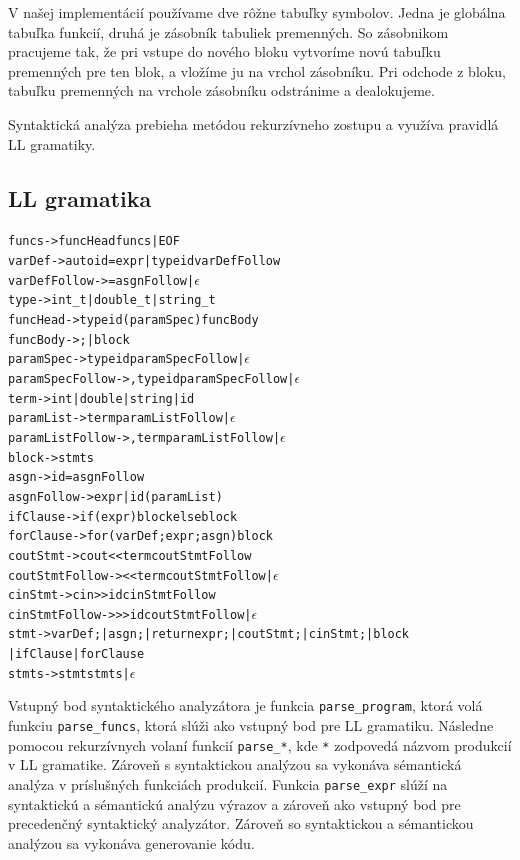 \documentclass[12pt,a4paper,titlepage,final]{article}
\begin{document}
V našej implementácií používame dve rôžne tabuľky symbolov. Jedna je globálna tabuľka funkcií, druhá je zásobník tabuliek premenných. So zásobnikom pracujeme tak, že pri vstupe do nového bloku vytvoríme novú tabuľku premenných pre ten blok, a vložíme ju na vrchol zásobníku. Pri odchode z bloku, tabuľku premenných na vrchole zásobníku odstránime a dealokujeme.

Syntaktická analýza prebieha metódou rekurzívneho zostupu a využíva pravidlá LL gramatiky. 

\subsection{LL gramatika}
\begin{alltt}

funcs -> funcHead funcs | EOF
varDef -> auto id = expr | type id varDefFollow
varDefFollow -> = asgnFollow | \(\epsilon\)
type -> int_t | double_t | string_t
funcHead -> type id ( paramSpec ) funcBody
	funcBody -> ; | block
paramSpec -> type id paramSpecFollow | \(\epsilon\)
	paramSpecFollow -> , type id paramSpecFollow | \(\epsilon\)
term -> int | double | string | id
paramList -> term paramListFollow | \(\epsilon\)
	paramListFollow -> , term paramListFollow | \(\epsilon\)
block -> { stmts }
asgn -> id = asgnFollow
asgnFollow -> expr | id ( paramList )
ifClause -> if ( expr ) block else block
forClause -> for ( varDef ; expr; asgn ) block
coutStmt -> cout << term coutStmtFollow
coutStmtFollow -> << term coutStmtFollow | \(\epsilon\) 
cinStmt -> cin >> id cinStmtFollow
cinStmtFollow -> >> id coutStmtFollow | \(\epsilon\)
stmt -> varDef; | asgn; | return expr; | coutStmt; | cinStmt; | block\\ | ifClause | forClause
stmts -> stmt stmts | \(\epsilon\)

\end{alltt}

Vstupný bod syntaktického analyzátora je funkcia \verb+parse_program+, ktorá volá funkciu \verb+parse_funcs+, ktorá slúži ako vstupný bod pre LL gramatiku. Následne pomocou rekurzívnych volaní funkcií \verb+parse_*+, kde \verb+*+ zodpovedá názvom produkcií v LL gramatike. Zároveň s syntaktickou analýzou sa vykonáva sémantická analýza v príslušných funkciách produkcií. Funkcia \verb+parse_expr+ slúží na syntaktickú a sémantickú analýzu výrazov a zároveň ako vstupný bod pre precedenčný syntaktický analyzátor. Zároveň so syntaktickou a sémantickou analýzou sa vykonáva generovanie kódu.

\end{document}
